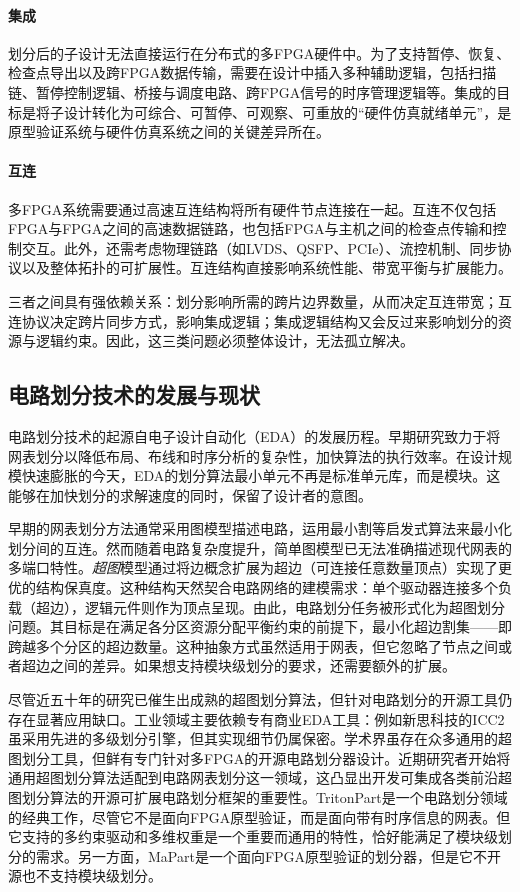 \paragraph{集成}
划分后的子设计无法直接运行在分布式的多FPGA硬件中。为了支持暂停、恢复、检查点导出以及跨FPGA数据传输，需要在设计中插入多种辅助逻辑，包括扫描链、暂停控制逻辑、桥接与调度电路、跨FPGA信号的时序管理逻辑等。集成的目标是将子设计转化为可综合、可暂停、可观察、可重放的“硬件仿真就绪单元”，是原型验证系统与硬件仿真系统之间的关键差异所在。

\paragraph{互连}
多FPGA系统需要通过高速互连结构将所有硬件节点连接在一起。互连不仅包括FPGA与FPGA之间的高速数据链路，也包括FPGA与主机之间的检查点传输和控制交互。此外，还需考虑物理链路（如LVDS、QSFP、PCIe）、流控机制、同步协议以及整体拓扑的可扩展性。互连结构直接影响系统性能、带宽平衡与扩展能力。


三者之间具有强依赖关系：划分影响所需的跨片边界数量，从而决定互连带宽；互连协议决定跨片同步方式，影响集成逻辑；集成逻辑结构又会反过来影响划分的资源与逻辑约束。因此，这三类问题必须整体设计，无法孤立解决。

\subsection{电路划分技术的发展与现状}

电路划分技术的起源自电子设计自动化（EDA）的发展历程。早期研究致力于将网表划分以降低布局、布线和时序分析的复杂性，加快算法的执行效率\cite{kernighan_efficient_1970, breuer_class_1988, dunlop_procedure_1985}。在设计规模快速膨胀的今天，EDA的划分算法最小单元不再是标准单元库，而是模块。这能够在加快划分的求解速度的同时，保留了设计者的意图。

早期的网表划分方法通常采用图模型描述电路，运用最小割等启发式算法来最小化划分间的互连。然而随着电路复杂度提升，简单图模型已无法准确描述现代网表的多端口特性。\emph{超图}模型通过将边概念扩展为超边（可连接任意数量顶点）实现了更优的结构保真度\cite{alpert_recent_1995}。这种结构天然契合电路网络的建模需求：单个驱动器连接多个负载（超边），逻辑元件则作为顶点呈现。由此，电路划分任务被形式化为超图划分问题。其目标是在满足各分区资源分配平衡约束的前提下，最小化超边割集——即跨越多个分区的超边数量。这种抽象方式虽然适用于网表，但它忽略了节点之间或者超边之间的差异。如果想支持模块级划分的要求，还需要额外的扩展。

尽管近五十年的研究已催生出成熟的超图划分算法，但针对电路划分的开源工具仍存在显著应用缺口。工业领域主要依赖专有商业EDA工具：例如新思科技的ICC2虽采用先进的多级划分引擎，但其实现细节仍属保密。学术界虽存在众多通用的超图划分工具，但鲜有专门针对多FPGA的开源电路划分器设计。近期研究者开始将通用超图划分算法适配到电路网表划分这一领域，这凸显出开发可集成各类前沿超图划分算法的开源可扩展电路划分框架的重要性。TritonPart是一个电路划分领域的经典工作，尽管它不是面向FPGA原型验证，而是面向带有时序信息的网表\cite{tritonpart_2023}。但它支持的多约束驱动和多维权重是一个重要而通用的特性，恰好能满足了模块级划分的需求。另一方面，MaPart是一个面向FPGA原型验证的划分器，但是它不开源也不支持模块级划分\cite{li_mapart_2024}。

